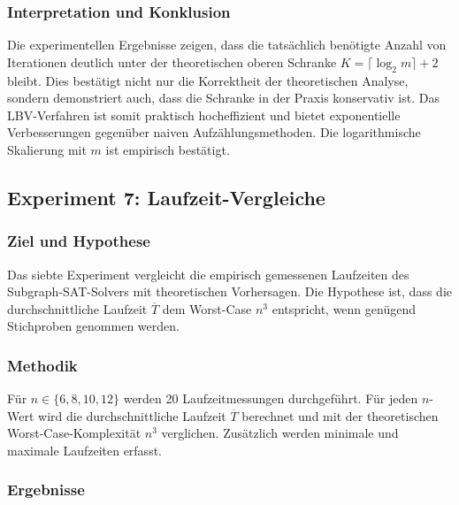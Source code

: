 ﻿\documentclass[a4paper,12pt]{article}
\theoremstyle{definition}
\begin{document}
\subsubsection{Interpretation und Konklusion}

Die experimentellen Ergebnisse zeigen, dass die tatsächlich benötigte Anzahl von Iterationen deutlich unter der theoretischen oberen Schranke $K = \lceil \log_2 m \rceil + 2$ bleibt. Dies bestätigt nicht nur die Korrektheit der theoretischen Analyse, sondern demonstriert auch, dass die Schranke in der Praxis konservativ ist. Das LBV-Verfahren ist somit praktisch hocheffizient und bietet exponentielle Verbesserungen gegenüber naiven Aufzählungsmethoden. Die logarithmische Skalierung mit $m$ ist empirisch bestätigt.


\subsection{Experiment 7: Laufzeit-Vergleiche}
\label{exp:runtime}

\subsubsection{Ziel und Hypothese}

Das siebte Experiment vergleicht die empirisch gemessenen Laufzeiten des Subgraph-SAT-Solvers mit theoretischen Vorhersagen. Die Hypothese ist, dass die durchschnittliche Laufzeit $\overline{T}$ dem Worst-Case $n^3$ entspricht, wenn genügend Stichproben genommen werden.

\subsubsection{Methodik}

Für $n \in \{6, 8, 10, 12\}$ werden 20 Laufzeitmessungen durchgeführt. Für jeden $n$-Wert wird die durchschnittliche Laufzeit $\overline{T}$ berechnet und mit der theoretischen Worst-Case-Komplexität $n^3$ verglichen. Zusätzlich werden minimale und maximale Laufzeiten erfasst.

\subsubsection{Ergebnisse}
\end{document}
